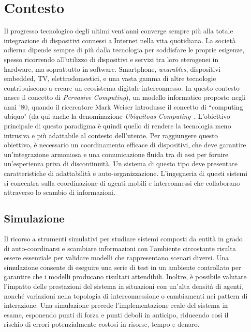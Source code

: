 \section{Contesto}
Il progresso tecnologico degli ultimi vent'anni converge sempre più alla totale integrazione di dispositivi connessi a Internet nella vita quotidiana. La società odierna dipende sempre di più dalla tecnologia per soddisfare le proprie esigenze, spesso ricorrendo all'utilizzo di dispositivi e servizi tra loro eterogenei in hardware, ma soprattutto in software. Smartphone, \textit{wearables}, dispositivi embedded, TV, elettrodomestici, e una vasta gamma di altre tecnologie contribuiscono a creare un ecosistema digitale interconnesso. In questo contesto nasce il concetto di \textit{Pervasive Computing}), un modello informatico proposto negli anni '80, quando il ricercatore Mark Weiser introdusse il concetto di ``computing ubiquo" (da qui anche la denominazione \textit{Ubiquitous Computing}~\cite{Weiser2002}.
L'obiettivo principale di questo paradigma è quindi quello di rendere la tecnologia meno intrusiva e più adattabile al contesto dell'utente.   Per raggiungere questo obiettivo, è necessario un coordinamento efficace di dispositivi, che deve garantire un'integrazione armoniosa e una comunicazione fluida tra di essi per fornire un'esperienza priva di discontinuità. Un sistema di questo tipo deve presentare caratteristiche di adattabilità e auto-organizzazione.
L'ingegneria di questi sistemi si concentra sulla coordinazione di agenti mobili e interconnessi che collaborano attraverso lo scambio di informazioni.
\subsection{Simulazione}

Il ricorso a strumenti simulativi per studiare sistemi composti da entità in grado di auto-coordinarsi e scambiare informazioni con l'ambiente circostante risulta essere essenziale per validare modelli che rappresentano scenari diversi. Una simulazione consente di eseguire una serie di test in un ambiente controllato per garantire che i modelli producano risultati attendibili. Inoltre, è possibile valutare l'impatto delle prestazioni del sistema in situazioni con un'alta densità di agenti, nonché variazioni nella topologia di interconnessione o cambiamenti nei pattern di interazione. Una simulazione precede l'implementazione reale del sistema in esame, esponendo punti di forza e punti deboli in anticipo, riducendo così il rischio di errori potenzialmente costosi in risorse, tempo e denaro.



